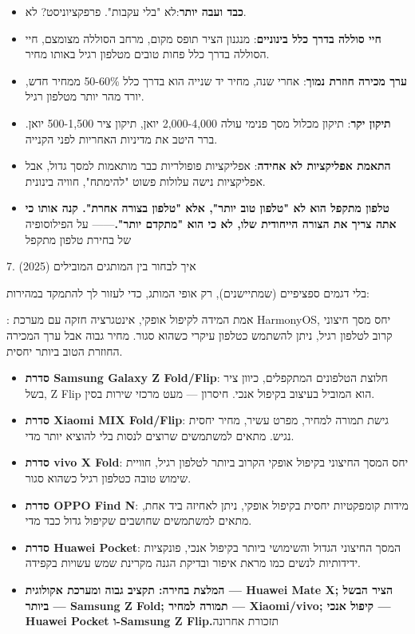 \begin{itemize}
  \item \textbf{כבד ועבה יותר}:לא "בלי עקבות". פרפקציוניסט? לא.
  \item \textbf{חיי סוללה בדרך כלל בינוניים}: מנגנון הציר תופס מקום, מרחב הסוללה מצומצם, חיי הסוללה בדרך כלל פחות טובים מטלפון רגיל באותו מחיר.
  \item \textbf{ערך מכירה חוזרת נמוך}: אחרי שנה, מחיר יד שנייה הוא בדרך כלל 50-60\% ממחיר חדש, יורד מהר יותר מטלפון רגיל.
  \item \textbf{תיקון יקר}: תיקון מכלול מסך פנימי עולה 2,000-4,000 יואן, תיקון ציר 500-1,500 יואן. ברר היטב את מדיניות האחריות לפני הקנייה.
  \item \textbf{התאמת אפליקציות לא אחידה}: אפליקציות פופולריות כבר מותאמות למסך גדול, אבל אפליקציות נישה עלולות פשוט "להימתח", חוויה בינונית.
  \item \textbf{טלפון מתקפל הוא לא "טלפון טוב יותר", אלא "טלפון בצורה אחרת". קנה אותו כי אתה צריך את הצורה הייחודית שלו, לא כי הוא "מתקדם יותר".}—— על הפילוסופיה של בחירת טלפון מתקפל
\end{itemize}

7. איך לבחור בין המותגים המובילים (2025)

בלי דגמים ספציפיים (שמתיישנים), רק אופי המותג, כדי לעזור לך להתמקד במהירות:


: אמת המידה לקיפול אופקי, אינטגרציה חזקה עם מערכת HarmonyOS, יחס מסך חיצוני קרוב לטלפון רגיל, ניתן להשתמש כטלפון עיקרי כשהוא סגור. מחיר גבוה אבל ערך המכירה החוזרת הטוב ביותר יחסית.

\begin{itemize}
  \item \textbf{סדרת Samsung Galaxy Z Fold/Flip}: חלוצת הטלפונים המתקפלים, כיוון ציר בשל, Z Flip הוא המוביל בעיצוב בקיפול אנכי. חיסרון — מעט מרכזי שירות בסין.
  \item \textbf{סדרת Xiaomi MIX Fold/Flip}: גישת תמורה למחיר, מפרט עשיר, מחיר יחסית נגיש. מתאים למשתמשים שרוצים לנסות בלי להוציא יותר מדי.
  \item \textbf{סדרת vivo X Fold}: יחס המסך החיצוני בקיפול אופקי הקרוב ביותר לטלפון רגיל, חוויית שימוש טובה כטלפון רגיל כשהוא סגור.
  \item \textbf{סדרת OPPO Find N}: מידות קומפקטיות יחסית בקיפול אופקי, ניתן לאחיזה ביד אחת, מתאים למשתמשים שחושבים שקיפול גדול כבד מדי.
  \item \textbf{סדרת Huawei Pocket}: המסך החיצוני הגדול והשימושי ביותר בקיפול אנכי, פונקציות ידידותיות לנשים כמו מראת איפור ובדיקת הגנה מקרינת שמש עשויות בקפידה.
  \item \textbf{המלצת בחירה: תקציב גבוה ומערכת אקולוגית — Huawei Mate X; הציר הבשל ביותר — Samsung Z Fold; תמורה למחיר — Xiaomi/vivo; קיפול אנכי — Huawei Pocket ו-Samsung Z Flip.}תזכורת אחרונה
\end{itemize}

